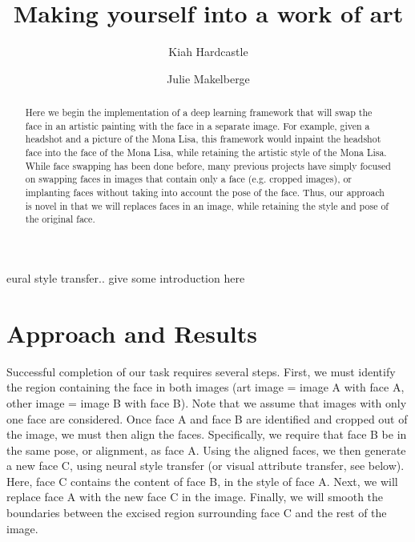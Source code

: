 \documentclass{pnastwo2}
\begin{document}
\title{Making yourself into a work of art}

\author{Kiah Hardcastle
\and Julie Makelberge}


\maketitle

\begin{article}

\begin{abstract}

Here we begin the implementation of a deep learning framework that will swap the face in an artistic painting with the face in a separate image. For example, given a headshot and a picture of the Mona Lisa, this framework would inpaint the headshot face into the face of the Mona Lisa, while retaining the artistic style of the Mona Lisa. While face swapping has been done before, many previous projects have simply focused on swapping faces in images that contain only a face (e.g. cropped images), or implanting faces without taking into account the pose of the face. Thus, our approach is novel in that we will replaces faces in an image, while retaining the style and pose of the original face.

\end{abstract}

eural style transfer.. give some introduction here

\section{Approach and Results}

Successful completion of our task requires several steps. First, we must identify the region containing the face in both images (art image = image A with face A, other image = image B with face B). Note that we assume that images with only one face are considered. Once face A and face B are identified and cropped out of the image, we must then align the faces. Specifically, we require that face B be in the same pose, or alignment, as face A. Using the aligned faces, we then generate a new face C, using neural style transfer (or visual attribute transfer, see below). Here, face C contains the content of face B, in the style of face A. Next, we will replace face A with the new face C in the image. Finally, we will smooth the boundaries between the excised region surrounding face C and the rest of the image.


\end{article}
\end{document}
